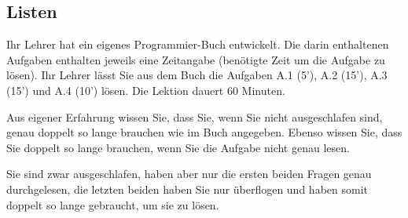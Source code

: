 \newtoggle{withbonus} \toggletrue{withbonus} %

\newcommand{\mycourse}{Grundlagenfach Informatik}
\newcommand{\myclass}{2. Klassen}
\newcommand{\mydate}{09. November 2023}

\lstset{style=python, basicstyle=\scriptsize\ttfamily,escapechar=!,xleftmargin=1.5em,
  frame=single,
  framexleftmargin=1.5em}

\clearpage
\begin{questions}
\section*{Listen}

Ihr Lehrer hat ein eigenes Programmier-Buch entwickelt. Die darin enthaltenen Aufgaben enthalten jeweils eine Zeitangabe (benötigte Zeit um die Aufgabe zu lösen). Ihr Lehrer lässt Sie aus dem Buch die Aufgaben A.1 (5'), A.2 (15'), A.3 (15') und A.4 (10') lösen. Die Lektion dauert 60 Minuten.

Aus eigener Erfahrung wissen Sie, dass Sie, wenn Sie nicht ausgeschlafen sind, genau doppelt so lange brauchen wie im Buch angegeben. Ebenso wissen Sie, dass Sie doppelt so lange brauchen, wenn Sie die Aufgabe nicht genau lesen.

Sie sind zwar ausgeschlafen, haben aber nur die ersten beiden Fragen genau durchgelesen, die letzten beiden haben Sie nur überflogen und haben somit doppelt so lange gebraucht, um sie zu lösen.

\end{questions}
